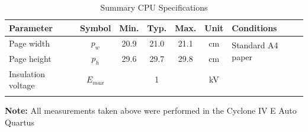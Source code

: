 \documentclass[10pt]{datasheet}
\begin{document}
\begin{table}[h]
\caption{Summary CPU Specifications}
\begin{tabularx}{\textwidth}{l | c | c c c | c | X}
    \thickhline
    \textbf{Parameter} & \textbf{Symbol} & \textbf{Min.} & \textbf{Typ.} & \textbf{Max.} &
    \textbf{Unit} & \textbf{Conditions} \\
    \hline
    Page width  & $p_w$ & 20.9 & 21.0 & 21.1 & cm & \multirow{2}{*}{Standard A4 paper} \\
    Page height & $p_h$ & 29.6 & 29.7 & 29.8 & cm &  \\
    \hline
    Insulation voltage & $E_{max}$\footnotemark[1] & & 1 & & kV & \\
    \thickhline
\end{tabularx}
\end{table}

\textbf{Note:} All measurements taken above were performed in the Cyclone IV E Auto Quartus
\end{document}
